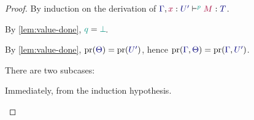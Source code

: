 \begin{proof}
  By induction on the derivation of $\tseq[\cs{p}]{\ty{\Gamma},\tmty{x}{U'}}{M}{T}$.
  \begin{case*}
    By \cref{lem:value-done}, $\cs{q}=\cs{\pbot}$.
    \begin{mathpar}
    \end{mathpar}
  \end{case*}
  \begin{case*}
    By \cref{lem:value-done}, $\pr(\ty{\Theta})=\pr(\ty{U'})$, hence $\pr(\ty{\Gamma},\ty{\Theta})=\pr(\ty{\Gamma},\ty{U'})$.
    \begin{mathpar}
    \end{mathpar}
  \end{case*}
  \begin{case*}
    There are two subcases:
    \begin{subcase*}[$\tm{x}\in\tm{M}$]
      Immediately, from the induction hypothesis.
      \begin{mathpar}
\end{mathpar}
\end{subcase*}
\end{case*}
\end{proof}
